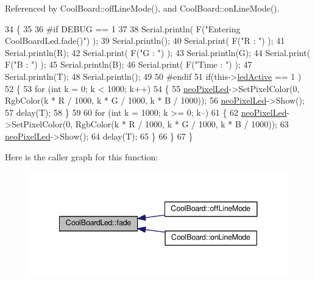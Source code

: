 Referenced by Cool\+Board\+::off\+Line\+Mode(), and Cool\+Board\+::on\+Line\+Mode().


\begin{DoxyCode}
34 \{
35 
36 \textcolor{preprocessor}{#if DEBUG == 1}
37 
38     Serial.println( F(\textcolor{stringliteral}{"Entering CoolBoardLed.fade()"}) );
39     Serial.println();
40     Serial.print( F(\textcolor{stringliteral}{"R : "}) );
41     Serial.println(R);
42     Serial.print( F(\textcolor{stringliteral}{"G : "}) );
43     Serial.println(G);
44     Serial.print( F(\textcolor{stringliteral}{"B : "}) );
45     Serial.println(B);
46     Serial.print( F(\textcolor{stringliteral}{"Time : "}) );
47     Serial.println(T);
48     Serial.println();
49 
50 \textcolor{preprocessor}{#endif  }
51     \textcolor{keywordflow}{if}(this->\hyperlink{classCoolBoardLed_a5f17c135516fcf4b44ea8a096ba0177a}{ledActive} == 1 )
52     \{
53         \textcolor{keywordflow}{for} (\textcolor{keywordtype}{int} k = 0; k < 1000; k++) 
54         \{
55             \hyperlink{classCoolBoardLed_ac2c13fa462a010cd9242bf297c013923}{neoPixelLed}->SetPixelColor(0, RgbColor(k * R / 1000, k * G / 1000, k * B / 1000));
56             \hyperlink{classCoolBoardLed_ac2c13fa462a010cd9242bf297c013923}{neoPixelLed}->Show();
57             delay(T);
58         \}
59         
60         \textcolor{keywordflow}{for} (\textcolor{keywordtype}{int} k = 1000; k >= 0; k--) 
61         \{
62             \hyperlink{classCoolBoardLed_ac2c13fa462a010cd9242bf297c013923}{neoPixelLed}->SetPixelColor(0, RgbColor(k * R / 1000, k * G / 1000, k * B / 1000));
63             \hyperlink{classCoolBoardLed_ac2c13fa462a010cd9242bf297c013923}{neoPixelLed}->Show();
64             delay(T);
65         \}
66     \}
67 \}
\end{DoxyCode}
Here is the caller graph for this function\+:\nopagebreak
\begin{figure}[H]
\begin{center}
\leavevmode
\includegraphics[width=341pt]{classCoolBoardLed_af1cacbaa88db8bcf6042c1083ba41155_icgraph}
\end{center}
\end{figure}
\mbox{\label{classCoolBoardLed_ab778f5e7bed0ab74e3906d82110493c3}} 
